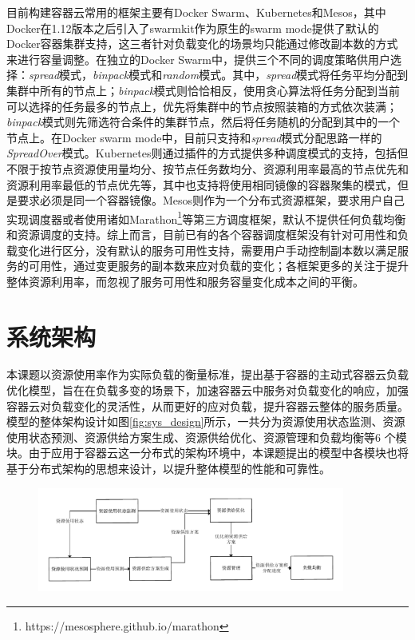 目前构建容器云常用的框架主要有Docker Swarm、Kubernetes和Mesos，其中Docker在1.12版本之后引入了swarmkit作为原生的swarm mode提供了默认的Docker容器集群支持，这三者针对负载变化的场景均只能通过修改副本数的方式来进行容量调整。在独立的Docker Swarm中，提供三个不同的调度策略供用户选择：\emph{spread}模式，\emph{binpack}模式和\emph{random}模式。其中，\emph{spread}模式将任务平均分配到集群中所有的节点上；\emph{binpack}模式则恰恰相反，使用贪心算法将任务分配到当前可以选择的任务最多的节点上，优先将集群中的节点按照装箱的方式依次装满；\emph{binpack}模式则先筛选符合条件的集群节点，然后将任务随机的分配到其中的一个节点上。在Docker swarm mode中，目前只支持和\emph{spread}模式分配思路一样的\emph{SpreadOver}模式。Kubernetes则通过插件的方式提供多种调度模式的支持，包括但不限于按节点资源使用量均分、按节点任务数均分、资源利用率最高的节点优先和资源利用率最低的节点优先等，其中也支持将使用相同镜像的容器聚集的模式，但是要求必须是同一个容器镜像。Mesos则作为一个分布式资源框架，要求用户自己实现调度器或者使用诸如Marathon\footnote{https://mesosphere.github.io/marathon}等第三方调度框架，默认不提供任何负载均衡和资源调度的支持。综上而言，目前已有的各个容器调度框架没有针对可用性和负载变化进行区分，没有默认的服务可用性支持，需要用户手动控制副本数以满足服务的可用性，通过变更服务的副本数来应对负载的变化；各框架更多的关注于提升整体资源利用率，而忽视了服务可用性和服务容量变化成本之间的平衡。

\section{系统架构}
本课题以资源使用率作为实际负载的衡量标准，提出基于容器的主动式容器云负载优化模型，旨在在负载多变的场景下，加速容器云中服务对负载变化的响应，加强容器云对负载变化的灵活性，从而更好的应对负载，提升容器云整体的服务质量。模型的整体架构设计如图\ref{fig:sys_design}所示，一共分为资源使用状态监测、资源使用状态预测、资源供给方案生成、资源供给优化、资源管理和负载均衡等6 个模块。由于应用于容器云这一分布式的架构环境中，本课题提出的模型中各模块也将基于分布式架构的思想来设计，以提升整体模型的性能和可靠性。
\begin{figure}[htbp]
\centering
\includegraphics[width=0.9\textwidth]{./figure/sys_design}
\end{figure}

